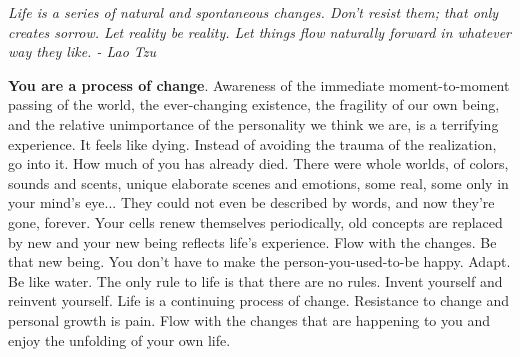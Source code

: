 \documentclass[a4paper,hidelinks]{article}
\begin{document}
\newpage

\begin{center}
\textit{
Life is a series of natural and spontaneous changes. Don't resist them; that only creates sorrow. Let reality be reality. Let things flow naturally forward in whatever way they like. - Lao Tzu
}
\end{center}

\textbf{You are a process of change}.
Awareness of the immediate moment-to-moment passing of the world, the ever-changing existence, the fragility of our own being, and the relative unimportance of the personality we think we are, is a terrifying experience.
It feels like dying.
Instead of avoiding the trauma of the realization, go into it.
How much of you has already died.
There were whole worlds, of colors, sounds and scents, unique elaborate scenes and emotions, some real, some only in your mind’s eye...
They could not even be described by words, and now they're gone, forever.
Your cells renew themselves periodically, old concepts are replaced by new and your new being reflects life’s experience.
Flow with the changes.
Be that new being.
You don’t have to make the person-you-used-to-be happy.
Adapt.
Be like water.
The only rule to life is that there are no rules.
Invent yourself and reinvent yourself.
Life is a continuing process of change.
Resistance to change and personal growth is pain.
Flow with the changes that are happening to you and enjoy the unfolding of your own life.




\end{document}
